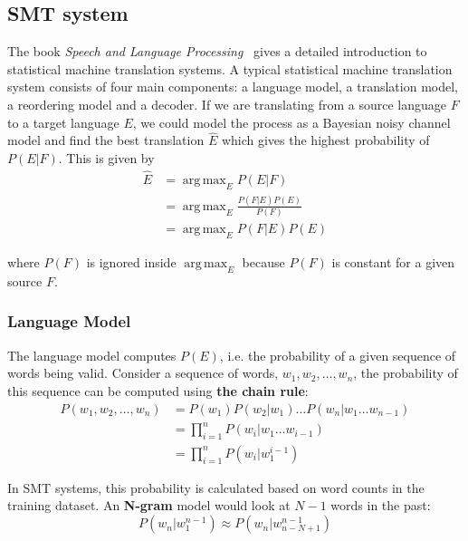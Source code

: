 \documentclass[12pt,a4paper,twoside]{report}
\DeclareMathOperator*{\argmax}{arg\,max}
\begin{document}
\subsection{SMT system}\label{section:SMT_system}
The book \textit{Speech and Language Processing}~\cite{Jurafsky:2009:SLP:1214993} gives a detailed introduction to statistical machine translation systems. A typical statistical machine translation system consists of four main components: a language model, a translation model, a reordering model and a decoder. If we are translating from a source language $F$ to a target language $E$, we could model the process as a Bayesian noisy channel model and find the best translation $\hat{E}$ which gives the highest probability of $P(E|F)$. This is given by
\begin{equation*}
    \begin{split}
        \hat{E} & = \argmax_E P(E|F)\\
         & = \argmax_E \frac{P(F|E)P(E)}{P(F)}\\
         & = \argmax_E P(F|E)P(E)
    \end{split}
\end{equation*}

where $P(F)$ is ignored inside $\argmax_E$ because $P(F)$ is constant for a given source $F$.

\subsubsection{Language Model}
The language model computes $P(E)$, i.e. the probability of a given sequence of words being valid. Consider a sequence of words, $w_1, w_2, \dots, w_n$, the probability of this sequence can be computed using \textbf{the chain rule}:
\begin{equation*}
\begin{split}
P(w_1, w_2, \dots, w_n) & = P(w_1)P(w_2|w_1)\dots P(w_n|w_1\dots w_{n-1})\\
 & = \prod_{i=1}^{n}P(w_i|w_1\dots w_{i-1})\\
 & = \prod_{i=1}^{n}P(w_i|w_1^{i-1})
\end{split}
\end{equation*}

In SMT systems, this probability is calculated based on word counts in the training dataset. An \textbf{N-gram} model would look at $N-1$ words in the past:
\begin{equation*}
P(w_n|w_1^{n-1}) \approx P(w_n|w_{n-N+1}^{n-1})
\end{equation*}
\end{document}
